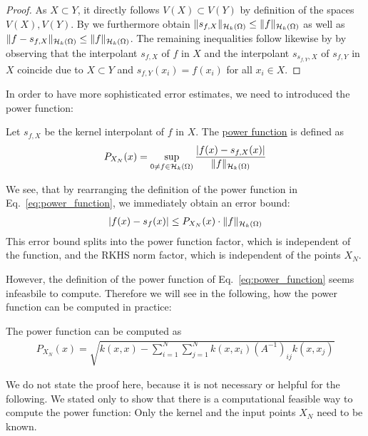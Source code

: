 \begin{proof}
As $X \subset Y$, it directly follows $V(X) \subset V(Y)$ by definition of the spaces $V(X), V(Y)$.
By  we furthermore obtain $\Vert s_{f, X} \Vert_{\mathcal H_k (\Omega)} \leq \Vert f \Vert_{\mathcal H_k (\Omega)}$ as well as $\Vert f - s_{f, X} \Vert_{\mathcal H_k (\Omega)} \leq \Vert f \Vert_{\mathcal H_k (\Omega)}$.
The remaining inequalities follow likewise by  by observing that the interpolant $s_{f, X}$ of $f$ in $X$ and the interpolant $s_{s_{f, Y}, X}$ of $s_{f, Y}$ in $X$ coincide due to $X \subset Y$ and $s_{f, Y}(x_i) = f(x_i)$ for all $x_i \in X$.
\end{proof}

In order to have more sophisticated error estimates, we need to introduced the power function:


\begin{definition}
Let $s_{f, X}$ be the kernel interpolant of $f$ in $X$. 
The \underline{power function} is defined as
\begin{align}
\label{eq:power_function}
P_{X_N}(x) = \sup_{0 \neq f \in \mathcal H_k (\Omega)} \frac{|f(x) - s_{f, X}(x)|}{\Vert f \Vert_{\mathcal H_k (\Omega)}}
\end{align}
\end{definition}

We see, that by rearranging the definition of the power function in Eq.~\eqref{eq:power_function}, 
we immediately obtain an error bound:
\begin{align*}
|f(x) - s_f(x)| \leq P_{X_N}(x) \cdot \Vert f \Vert_{\mathcal H_k (\Omega)}
\end{align*}
This error bound splits into the power function factor, which is independent of the function,
and the RKHS norm factor, which is independent of the points $X_N$.

However, the definition of the power function of Eq.~\eqref{eq:power_function} seems infeasbile to compute.
Therefore we will see in the following, 
how the power function can be computed in practice:

\begin{prop}
\label{prop:power_func_via_lagrange}
The power function can be computed as
\begin{align*}
P_{X_N}(x) = \sqrt{k(x, x) - \sum_{i=1}^N \sum_{j=1}^N k(x, x_i) (A^{-1})_{ij} k(x, x_j)}
\end{align*}
\end{prop}

We do not state the proof here, because it is not necessary or helpful for the following.
We stated  only to show that there is a computational feasible way to compute the power function:
Only the kernel and the input points $X_N$ need to be known.


